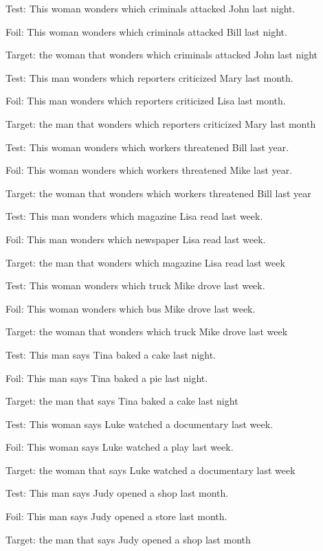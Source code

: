 \ex %
Test: This woman wonders which criminals attacked John last night.\par\nobreak
Foil: This woman wonders which criminals attacked Bill last night.\par\nobreak
Target: the woman that wonders which criminals attacked John last night
\xe

\ex %
Test: This man wonders which reporters criticized Mary last month.\par\nobreak
Foil: This man wonders which reporters criticized Lisa last month.\par\nobreak
Target: the man that wonders which reporters criticized Mary last month
\xe

\ex %
Test: This woman wonders which workers threatened Bill last year.\par\nobreak
Foil: This woman wonders which workers threatened Mike last year.\par\nobreak
Target: the woman that wonders which workers threatened Bill last year
\xe

\ex %
Test: This man wonders which magazine Lisa read last week.\par\nobreak
Foil: This man wonders which newspaper Lisa read last week.\par\nobreak
Target: the man that wonders which magazine Lisa read last week
\xe

\ex %
Test: This woman wonders which truck Mike drove last week.\par\nobreak
Foil: This woman wonders which bus Mike drove last week.\par\nobreak
Target: the woman that wonders which truck Mike drove last week
\xe

\ex %
Test: This man says Tina baked a cake last night.\par\nobreak
Foil: This man says Tina baked a pie last night.\par\nobreak
Target: the man that says Tina baked a cake last night
\xe

\ex %
Test: This woman says Luke watched a documentary last week.\par\nobreak
Foil: This woman says Luke watched a play last week.\par\nobreak
Target: the woman that says Luke watched a documentary last week
\xe

\ex %
Test: This man says Judy opened a shop last month.\par\nobreak
Foil: This man says Judy opened a store last month.\par\nobreak
Target: the man that says Judy opened a shop last month
\xe

